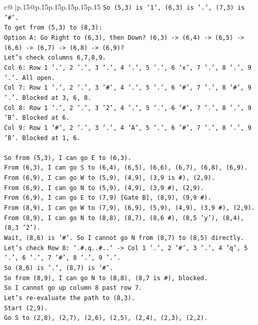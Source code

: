\documentclass{article}
\begin{document}
{\begin{supertabular}{c@{$\;$}|p{.15\linewidth}@{}p{.15\linewidth}p{.15\linewidth}p{.15\linewidth}p{.15\linewidth}p{.15\linewidth}}
{{{\texttt{So (5,3) is '1', (6,3) is '.', (7,3) is '\#'.} \\
\texttt{To get from (5,3) to (8,3):} \\
\texttt{Option A: Go Right to (6,3), then Down? (6,3) {-}> (6,4) {-}> (6,5) {-}> (6,6) {-}> (6,7) {-}> (6,8) {-}> (6,9)?} \\
\texttt{Let's check columns 6,7,8,9.} \\
\texttt{Col 6: Row 1 '.', 2 '.', 3 '.', 4 '.', 5 '.', 6 'x', 7 '.', 8 '.', 9 '.'. All open.} \\
\texttt{Col 7: Row 1 '.', 2 '.', 3 '\#', 4 '.', 5 '.', 6 '\#', 7 '.', 8 '\#', 9 '.'. Blocked at 3, 6, 8.} \\
\texttt{Col 8: Row 1 '.', 2 '.', 3 '2', 4 '.', 5 '.', 6 '\#', 7 '.', 8 '.', 9 'B'. Blocked at 6.} \\
\texttt{Col 9: Row 1 '\#', 2 '.', 3 '.', 4 'A', 5 '.', 6 '\#', 7 '.', 8 '.', 9 'B'. Blocked at 1, 6.} \\
\\ 
\texttt{So from (5,3), I can go E to (6,3).} \\
\texttt{From (6,3), I can go S to (6,4), (6,5), (6,6), (6,7), (6,8), (6,9).} \\
\texttt{From (6,9), I can go W to (5,9), (4,9), (3,9 is \#), (2,9).} \\
\texttt{From (6,9), I can go N to (5,9), (4,9), (3,9 \#), (2,9).} \\
\texttt{From (6,9), I can go E to (7,9) {[}Gate B{]}, (8,9), (9,9 \#).} \\
\texttt{From (8,9), I can go W to (7,9), (6,9), (5,9), (4,9), (3,9 \#), (2,9).} \\
\texttt{From (8,9), I can go N to (8,8), (8,7), (8,6 \#), (8,5 'y'), (8,4), (8,3 '2').} \\
\texttt{Wait, (8,6) is '\#'. So I cannot go N from (8,7) to (8,5) directly.} \\
\texttt{Let's check Row 8: `.\#.q..\#..` {-}> Col 1 '.', 2 '\#', 3 '.', 4 'q', 5 '.', 6 '.', 7 '\#', 8 '.', 9 '.'.} \\
\texttt{So (8,6) is '.', (8,7) is '\#'.} \\
\texttt{So from (8,9), I can go N to (8,8), (8,7 is \#), blocked.} \\
\texttt{So I cannot go up column 8 past row 7.} \\
\texttt{Let's re{-}evaluate the path to (8,3).} \\
\texttt{Start (2,9).} \\
\texttt{Go S to (2,8), (2,7), (2,6), (2,5), (2,4), (2,3), (2,2).} \\
}}}
\end{supertabular}}
\end{document}
